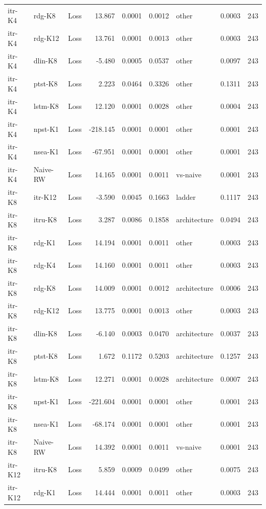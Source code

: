 \begin{table}[!t]
\begin{tabular}{llcrrrlrr}
itr-K4 & rdg-K8 & Loss & 13.867 & 0.0001 & 0.0012 & other & 0.0003 & 243 \\
itr-K4 & rdg-K12 & Loss & 13.761 & 0.0001 & 0.0013 & other & 0.0003 & 243 \\
itr-K4 & dlin-K8 & Loss & -5.480 & 0.0005 & 0.0537 & other & 0.0097 & 243 \\
itr-K4 & ptst-K8 & Loss & 2.223 & 0.0464 & 0.3326 & other & 0.1311 & 243 \\
itr-K4 & lstm-K8 & Loss & 12.120 & 0.0001 & 0.0028 & other & 0.0004 & 243 \\
itr-K4 & npst-K1 & Loss & -218.145 & 0.0001 & 0.0001 & other & 0.0001 & 243 \\
itr-K4 & nsea-K1 & Loss & -67.951 & 0.0001 & 0.0001 & other & 0.0001 & 243 \\
itr-K4 & Naive-RW & Loss & 14.165 & 0.0001 & 0.0011 & vs-naive & 0.0001 & 243 \\
itr-K8 & itr-K12 & Loss & -3.590 & 0.0045 & 0.1663 & ladder & 0.1117 & 243 \\
itr-K8 & itru-K8 & Loss & 3.287 & 0.0086 & 0.1858 & architecture & 0.0494 & 243 \\
itr-K8 & rdg-K1 & Loss & 14.194 & 0.0001 & 0.0011 & other & 0.0003 & 243 \\
itr-K8 & rdg-K4 & Loss & 14.160 & 0.0001 & 0.0011 & other & 0.0003 & 243 \\
itr-K8 & rdg-K8 & Loss & 14.009 & 0.0001 & 0.0012 & architecture & 0.0006 & 243 \\
itr-K8 & rdg-K12 & Loss & 13.775 & 0.0001 & 0.0013 & other & 0.0003 & 243 \\
itr-K8 & dlin-K8 & Loss & -6.140 & 0.0003 & 0.0470 & architecture & 0.0037 & 243 \\
itr-K8 & ptst-K8 & Loss & 1.672 & 0.1172 & 0.5203 & architecture & 0.1257 & 243 \\
itr-K8 & lstm-K8 & Loss & 12.271 & 0.0001 & 0.0028 & architecture & 0.0007 & 243 \\
itr-K8 & npst-K1 & Loss & -221.604 & 0.0001 & 0.0001 & other & 0.0001 & 243 \\
itr-K8 & nsea-K1 & Loss & -68.174 & 0.0001 & 0.0001 & other & 0.0001 & 243 \\
itr-K8 & Naive-RW & Loss & 14.392 & 0.0001 & 0.0011 & vs-naive & 0.0001 & 243 \\
itr-K12 & itru-K8 & Loss & 5.859 & 0.0009 & 0.0499 & other & 0.0075 & 243 \\
itr-K12 & rdg-K1 & Loss & 14.444 & 0.0001 & 0.0011 & other & 0.0003 & 243 \\

\end{tabular}
\end{table}
